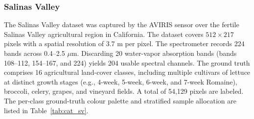 \documentclass[manuscript,screen,review]{acmart}
\begin{document}
\subsubsection{Salinas Valley}
The Salinas Valley dataset was captured by the AVIRIS sensor \cite{green1998imaging} over the fertile Salinas Valley agricultural region in California. The dataset covers $512 \times 217$ pixels with a spatial resolution of 3.7 m per pixel. The spectrometer records 224 bands across 0.4--2.5 $\mu$m. Discarding 20 water-vapor absorption bands (bands 108--112, 154--167, and 224) yields 204 usable spectral channels. The ground truth comprises 16 agricultural land-cover classes, including multiple cultivars of lettuce at distinct growth stages (e.g., 4-week, 5-week, 6-week, and 7-week Romaine), broccoli, celery, grapes, and vineyard fields. A total of 54,129 pixels are labeled. The per-class ground-truth colour palette and stratified sample allocation are listed in Table~\ref{tab:cat_sv}.
\end{document}
